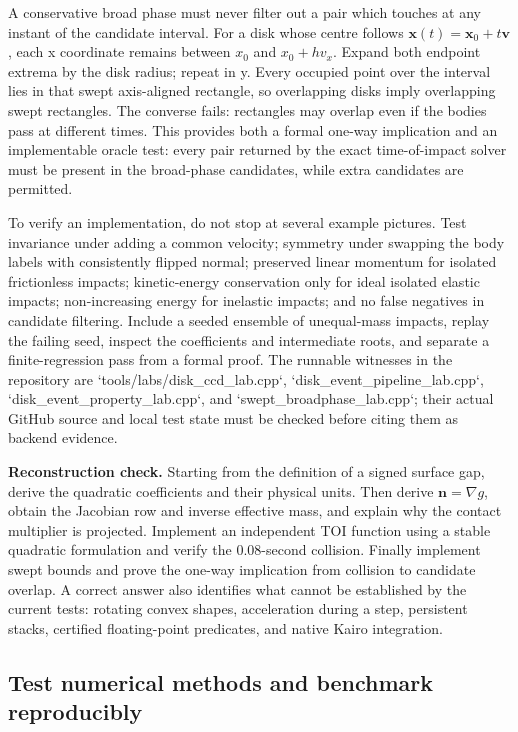 A conservative broad phase must never filter out a pair which touches at any instant of the candidate interval. For a disk whose centre follows \(\mathbf x(t)=\mathbf x_0+t\mathbf v\), each x coordinate remains between \(x_0\) and \(x_0+hv_x\). Expand both endpoint extrema by the disk radius; repeat in y. Every occupied point over the interval lies in that swept axis-aligned rectangle, so overlapping disks imply overlapping swept rectangles. The converse fails: rectangles may overlap even if the bodies pass at different times. This provides both a formal one-way implication and an implementable oracle test: every pair returned by the exact time-of-impact solver must be present in the broad-phase candidates, while extra candidates are permitted.

To verify an implementation, do not stop at several example pictures. Test invariance under adding a common velocity; symmetry under swapping the body labels with consistently flipped normal; preserved linear momentum for isolated frictionless impacts; kinetic-energy conservation only for ideal isolated elastic impacts; non-increasing energy for inelastic impacts; and no false negatives in candidate filtering. Include a seeded ensemble of unequal-mass impacts, replay the failing seed, inspect the coefficients and intermediate roots, and separate a finite-regression pass from a formal proof. The runnable witnesses in the repository are `tools/labs/disk\_ccd\_lab.cpp`, `disk\_event\_pipeline\_lab.cpp`, `disk\_event\_property\_lab.cpp`, and `swept\_broadphase\_lab.cpp`; their actual GitHub source and local test state must be checked before citing them as backend evidence.

\textbf{Reconstruction check.} Starting from the definition of a signed surface gap, derive the quadratic coefficients and their physical units. Then derive \(\mathbf n=\nabla g\), obtain the Jacobian row and inverse effective mass, and explain why the contact multiplier is projected. Implement an independent TOI function using a stable quadratic formulation and verify the 0.08-second collision. Finally implement swept bounds and prove the one-way implication from collision to candidate overlap. A correct answer also identifies what cannot be established by the current tests: rotating convex shapes, acceleration during a step, persistent stacks, certified floating-point predicates, and native Kairo integration.

\subsection{Test numerical methods and benchmark reproducibly}\label{test-numerical-methods-and-benchmark-reproducibly}

